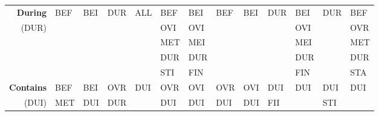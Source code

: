 \documentclass[11pt]{report}
\newenvironment{vvarmargin}[2]
{
  \begin{list}{}
  {
    \setlength{\topsep}{0pt}
    \setlength{\leftmargin}{0pt}
    \setlength{\rightmargin}{0pt}
    \setlength{\listparindent}{\parindent}
    \setlength{\itemindent}{\parindent}
    \setlength{\parsep}{0pt plus 1pt}
    \addtolength{\leftmargin}{#1}\addtolength{\rightmargin}{#2}
  }
  \item
}
{
  \end{list}
}
\begin{document}
\begin{table}[p]
\begin{vvarmargin}{-4cm}{-4cm}
\begin{center}
\begin{tabular}[t]{|r|l|l|l|l|l|l|l|l|l|l|l|l|}
                  \hline
                  \textbf{During}         & BEF                     & BEI                     & DUR                     & ALL                     & BEF                     & BEI                     & BEF                     & BEI                     & DUR                     & BEI                     & DUR                     & BEF                     \\
                  (DUR)                   &                         &                         &                         &                         & OVI                     & OVI                     &                         &                         &                         & OVI                     &                         & OVR                     \\
                                          &                         &                         &                         &                         & MET                     & MEI                     &                         &                         &                         & MEI                     &                         & MET                     \\
                                          &                         &                         &                         &                         & DUR                     & DUR                     &                         &                         &                         & DUR                     &                         & DUR                     \\
                                          &                         &                         &                         &                         & STI                     & FIN                     &                         &                         &                         & FIN                     &                         & STA                     \\
                  \hline
                  \textbf{Contains}       & BEF                     & BEI                     & OVR                     & DUI                     & OVR                     & OVI                     & OVR                     & OVI                     & DUI                     & DUI                     & DUI                     & DUI                     \\
                  (DUI)                   & MET                     & DUI                     & DUR                     &                         & DUI                     & DUI                     & DUI                     & DUI                     & FII                     &                         & STI                     &                         \\

\end{tabular}
\end{center}
\end{vvarmargin}
\end{table}
\end{document}
